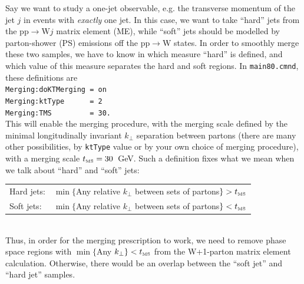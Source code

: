\documentclass[12pt,a4paper]{article}
\newcommand{\p}{{\mathrm p}}
\newcommand{\W}{{\mathrm W}}
\newcommand{\tms}{\ensuremath{t_{\textnormal{\tiny MS}}}}
\begin{document}
Say we want to study a one-jet observable, e.g. the transverse 
momentum of the jet $j$ in events with \emph{exactly} one jet. In this case, 
we want to take ``hard'' jets from the $\p\p \to \W j$ matrix element 
(ME), while ``soft'' jets should be modelled by parton-shower (PS) 
emissions off the $\p\p \to \W$ states. In order to smoothly merge these 
two samples, we have to know in which measure ``hard'' is defined, and 
which value of this measure separates the hard and soft regions. In 
\texttt{main80.cmnd}, these definitions are\\ 
\hspace*{10mm}\texttt{Merging:doKTMerging = on}\\
\hspace*{10mm}\texttt{Merging:ktType~~~~~~= 2}\\
\hspace*{10mm}\texttt{Merging:TMS~~~~~~~~~= 30.}\\
This will enable the merging procedure, with the merging scale defined by 
the minimal longitudinally invariant $k_\perp$ separation between partons
(there are many other possibilities, by \texttt{ktType} value or by your
own choice of merging procedure), with a merging scale $\tms = 30$~GeV. 
Such a definition fixes what we mean when we talk about ``hard'' 
and ``soft'' jets:
\vspace*{2mm}\\
\hspace*{8mm}
\begin{tabular}{l l}
Hard jets:  & $\min\{$Any relative $k_{\perp}$ between sets of 
partons$\} > \tms$\\
Soft jets:  & $\min\{$Any relative $k_{\perp}$ between sets of 
partons$\} < \tms$
\end{tabular}\vspace*{2mm}\\
Thus, in order for the merging prescription to work, we need to remove
phase space regions with $\min\{$Any $k_{\perp}\} < \tms$
from the W+1-parton matrix element calculation. Otherwise, there would
be an overlap between the ``soft jet'' and ``hard jet'' samples. 
 
\end{document}
